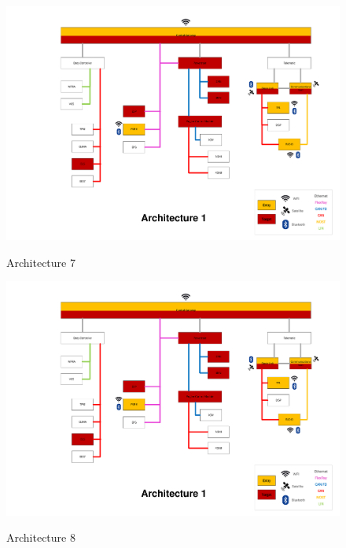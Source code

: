 \begin{figure}[h]
    \centering
    \caption{Architecture 7}
    \includegraphics[width=\textwidth, page=7]{../Architectures-survey.pdf}
    \label{fig:architecture7}
\end{figure}

\begin{figure}[h]
    \centering
    \caption{Architecture 8}
    \includegraphics[width=\textwidth, page=8]{../Architectures-survey.pdf}
    \label{fig:architecture8}
\end{figure}

